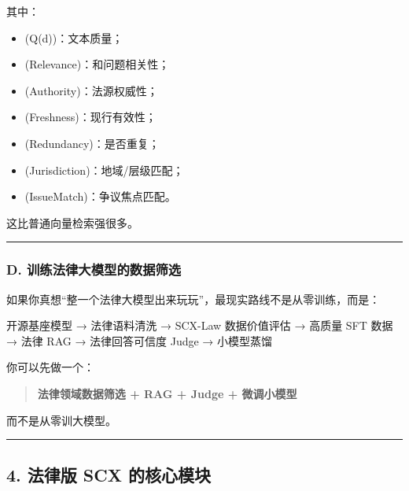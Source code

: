 \documentclass[
  12pt,
]{ctexart}
\newenvironment{Shaded}{}{}
\newcommand{\NormalTok}[1]{#1}
\providecommand{\tightlist}{%
  \setlength{\itemsep}{0pt}\setlength{\parskip}{0pt}}
\begin{document}
其中：

\begin{itemize}
\tightlist
\item
  (Q(d))：文本质量；
\item
  (Relevance)：和问题相关性；
\item
  (Authority)：法源权威性；
\item
  (Freshness)：现行有效性；
\item
  (Redundancy)：是否重复；
\item
  (Jurisdiction)：地域/层级匹配；
\item
  (IssueMatch)：争议焦点匹配。
\end{itemize}

这比普通向量检索强很多。

\begin{center}\rule{0.5\linewidth}{0.5pt}\end{center}

\subsubsection{D.
训练法律大模型的数据筛选}\label{d.-ux8badux7ec3ux6cd5ux5f8bux5927ux6a21ux578bux7684ux6570ux636eux7b5bux9009}

如果你真想``整一个法律大模型出来玩玩''，最现实路线不是从零训练，而是：

\begin{Shaded}
\begin{Highlighting}[]
\NormalTok{开源基座模型}
\NormalTok{→ 法律语料清洗}
\NormalTok{→ SCX{-}Law 数据价值评估}
\NormalTok{→ 高质量 SFT 数据}
\NormalTok{→ 法律 RAG}
\NormalTok{→ 法律回答可信度 Judge}
\NormalTok{→ 小模型蒸馏}
\end{Highlighting}
\end{Shaded}

你可以先做一个：

\begin{quote}
\textbf{法律领域数据筛选 + RAG + Judge + 微调小模型}
\end{quote}

而不是从零训大模型。

\begin{center}\rule{0.5\linewidth}{0.5pt}\end{center}

\subsection{4. 法律版 SCX
的核心模块}\label{ux6cd5ux5f8bux7248-scx-ux7684ux6838ux5fc3ux6a21ux5757}
\end{document}
